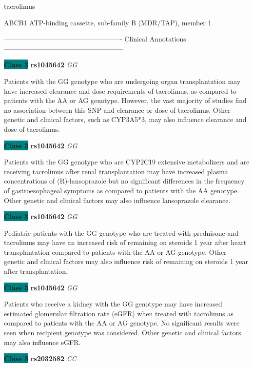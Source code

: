\documentclass{resume} %
\begin{document}
\begin{rSection}{ tacrolimus }
\begin{rSubsection}{ ABCB1 }{ ATP-binding cassette, sub-family B (MDR/TAP), member 1 }{}{}
\item[]

\item[] ---------------------------------------------------- Clinical Annotations -----------------------------------------------------\newline
\item \textbf{\colorbox{teal} {Class 3}} \textbf{ rs1045642 } \textit{ GG }
\item[] Patients with the GG genotype who are undergoing organ transplantation may have increased clearance and dose requirements of tacrolimus, as compared to patients with the AA or AG genotype. However, the vast majority of studies find no association between this SNP and clearance or dose of tacrolimus. Other genetic and clinical factors, such as CYP3A5*3, may also influence clearance and dose of tacrolimus. \item \textbf{\colorbox{teal} {Class 3}} \textbf{ rs1045642 } \textit{ GG }
\item[] Patients with the GG genotype who are CYP2C19 extensive metabolizers and are receiving tacrolimus after renal transplantation may have increased plasma concentrations of (R)-lansoprazole but no significant differences in the frequency of gastroesophageal symptoms as compared to patients with the AA genotype. Other genetic and clinical factors may also influence lansoprazole clearance.\item \textbf{\colorbox{teal} {Class 3}} \textbf{ rs1045642 } \textit{ GG }
\item[] Pediatric patients with the GG genotype who are treated with prednisone and tacrolimus may have an increased risk of remaining on steroids 1 year after heart transplantation compared to patients with the AA or AG genotype. Other genetic and clinical factors may also influence risk of remaining on steroids 1 year after transplantation.\item \textbf{\colorbox{teal} {Class 3}} \textbf{ rs1045642 } \textit{ GG }
\item[] Patients who receive a kidney with the GG genotype may have increased estimated glomerular filtration rate (eGFR) when treated with tacrolimus as compared to patients with the AA or AG genotype. No significant results were seen when recipient genotype was considered. Other genetic and clinical factors may also influence eGFR. \item \textbf{\colorbox{teal} {Class 3}} \textbf{ rs2032582 } \textit{ CC }

\end{rSubsection}
\end{rSection}
\end{document}
